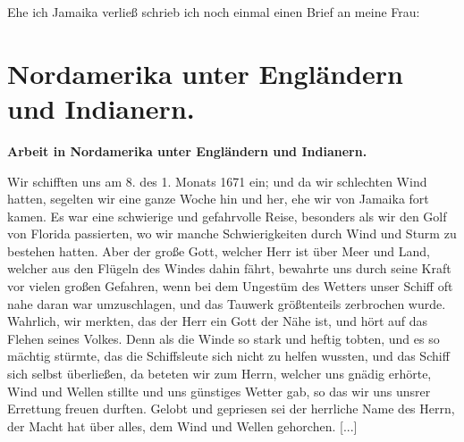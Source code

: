 Ehe ich Jamaika verließ schrieb ich noch einmal einen Brief
an meine Frau:


\chapter[Nordamerika unter Engländern und Indianern.]{Nordamerika unter Engländern und Indianern.}

\begin{center}
\textbf{Arbeit in Nordamerika unter Engländern und Indianern.}
\end{center}


Wir schifften uns am 8. des 1. Monats 1671 ein; und da
wir schlechten Wind hatten, segelten wir eine ganze Woche hin
und her, ehe wir von Jamaika fort kamen. Es war eine 
schwierige und gefahrvolle Reise, besonders als wir den Golf von
Florida passierten, wo wir manche Schwierigkeiten durch Wind
und Sturm zu bestehen hatten. Aber der große Gott, welcher
Herr ist über Meer und Land, welcher aus den Flügeln des
Windes dahin fährt, bewahrte uns durch seine Kraft vor vielen
großen Gefahren, wenn bei dem Ungestüm des Wetters unser
Schiff oft nahe daran war umzuschlagen, und das Tauwerk 
größtenteils zerbrochen wurde. Wahrlich, wir merkten, das der Herr ein
Gott der Nähe ist, und hört auf das Flehen seines Volkes. Denn
als die Winde so stark und heftig tobten, und es so mächtig
stürmte, das die Schiffsleute sich nicht zu helfen wussten, und
das Schiff sich selbst überließen, da beteten wir zum Herrn, welcher
uns gnädig erhörte, Wind und Wellen stillte und uns günstiges
Wetter gab, so das wir uns unsrer Errettung freuen durften.
Gelobt und gepriesen sei der herrliche Name des Herrn, der
Macht hat über alles, dem Wind und Wellen gehorchen. [...]

